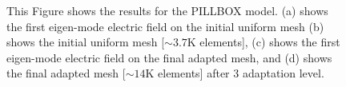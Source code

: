 \documentclass[review,12pt]{elsarticle_summary_report}
\begin{document}
\begin{landscape}
\begin{figure}[ph!]
\hspace*{50pt}
\caption{\label{pill} This Figure shows the results for the PILLBOX model. (a) shows the first eigen-mode electric field on the initial uniform mesh (b) shows the initial uniform mesh [$\sim3.7\text{K}$ elements], (c) shows the first eigen-mode electric field on the final adapted mesh, and (d) shows the final adapted mesh [$\sim14\text{K}$ elements] after 3 adaptation level.}
\end{figure}
\end{landscape}
\end{document}
